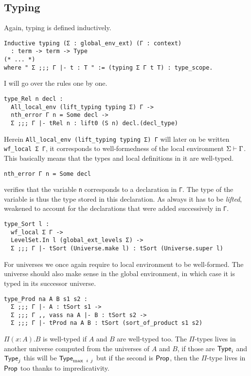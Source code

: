 \subsection{Typing}

Again, typing is defined inductively.
\begin{verbatim}
Inductive typing (Σ : global_env_ext) (Γ : context)
  : term -> term -> Type
(* ... *)
where " Σ ;;; Γ |- t : T " := (typing Σ Γ t T) : type_scope.
\end{verbatim}
I will go over the rules one by one.

\begin{verbatim}
type_Rel n decl :
  All_local_env (lift_typing typing Σ) Γ ->
  nth_error Γ n = Some decl ->
  Σ ;;; Γ |- tRel n : lift0 (S n) decl.(decl_type)
\end{verbatim}
Herein \texttt{All_local_env (lift_typing typing Σ) Γ} will later on
be written \texttt{wf_local Σ Γ}, it corresponds to well-formedness
of the local environment \(\Sigma \vdash \Gamma\). This basically means that
the types and local definitions in it are well-typed.
\begin{verbatim}
nth_error Γ n = Some decl
\end{verbatim}
verifies that the variable
\texttt{n} corresponds to a declaration in \texttt{Γ}.
The type of the variable is thus the type stored in this declaration. As always
it has to be \emph{lifted}, \ie weakened to account for the declarations
that were added successively in \texttt{Γ}.

\begin{verbatim}
type_Sort l :
  wf_local Σ Γ ->
  LevelSet.In l (global_ext_levels Σ) ->
  Σ ;;; Γ |- tSort (Universe.make l) : tSort (Universe.super l)
\end{verbatim}
For universes we once again require to local environment to be well-formed.
The universe should also make sense in the global environment, in which case it
is typed in its successor universe.

\begin{verbatim}
type_Prod na A B s1 s2 :
  Σ ;;; Γ |- A : tSort s1 ->
  Σ ;;; Γ ,, vass na A |- B : tSort s2 ->
  Σ ;;; Γ |- tProd na A B : tSort (sort_of_product s1 s2)
\end{verbatim}
\(\Pi (x:A).B\) is well-typed if \(A\) and \(B\) are well-typed too.
The \(\Pi\)-types lives in another universe computed from the universes of
\(A\) and \(B\), if those are \(\mathsf{Type}_i\) and \(\mathsf{Type}_j\) this will be
\(\mathsf{Type}_{\max\ i\ j}\) but if the second is \(\mathsf{Prop}\), then the \(\Pi\)-type
lives in \(\mathsf{Prop}\) too thanks to impredicativity.

